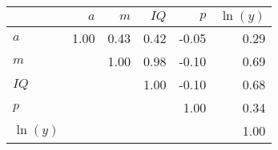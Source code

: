 \begin{tabular}{lrrrrr}
\hline
 & $a$  & $m$  & $IQ$  & $p$  & $\ln(y)$  \\
\hline
$a$ & 1.00  & 0.43  & 0.42  & -0.05  & 0.29  \\
$m$ &   & 1.00  & 0.98  & -0.10  & 0.69  \\
$IQ$ &   &   & 1.00  & -0.10  & 0.68  \\
$p$ &   &   &   & 1.00  & 0.34  \\
$\ln(y)$ &   &   &   &   & 1.00  \\
\hline
\end{tabular}%
